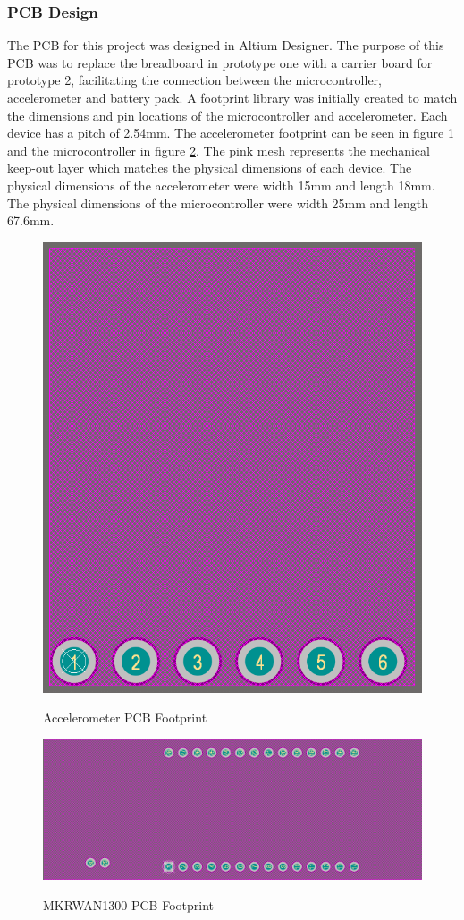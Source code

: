 \subsubsection{PCB Design}
The PCB for this project was designed in Altium Designer. The purpose of this PCB was to replace the breadboard in prototype one with a carrier board for prototype 2, facilitating the connection between the microcontroller, accelerometer and battery pack. A footprint library was initially created to match the dimensions and pin locations of the microcontroller and accelerometer. Each device has a pitch of 2.54mm. The accelerometer footprint can be seen in figure \ref{accel-footprint} and the microcontroller in figure \ref{micro-footprint}. The pink mesh represents the mechanical keep-out layer which matches the physical dimensions of each device. The physical dimensions of the accelerometer were width 15mm and length 18mm. The physical dimensions of the microcontroller were width 25mm and length 67.6mm. 

\begin{figure}[H]
	\centering 
	\caption{Accelerometer PCB Footprint}
	\includegraphics[width=.4\textwidth]{Sections/Design-Process/accel-footprint.png}
	\label{accel-footprint}
\end{figure}

\begin{figure}[H]
	\centering
	\caption{MKRWAN1300 PCB Footprint}
	\includegraphics[width=.6\textwidth]{Sections/Design-Process/micro-footprint.png}
	\label{micro-footprint}
\end{figure}


